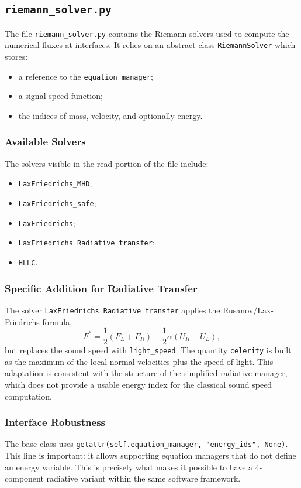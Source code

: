 \documentclass[a4paper, 11pt]{article}
\begin{document}
\subsection{\texttt{riemann\_solver.py}}
The file \texttt{riemann\_solver.py} contains the Riemann solvers used to compute the numerical fluxes at interfaces. It relies on an abstract class \texttt{RiemannSolver} which stores:
\begin{itemize}
    \item a reference to the \texttt{equation\_manager};
    \item a signal speed function;
    \item the indices of mass, velocity, and optionally energy.
\end{itemize}

\subsubsection*{Available Solvers}
The solvers visible in the read portion of the file include:
\begin{itemize}
    \item \texttt{LaxFriedrichs\_MHD};
    \item \texttt{LaxFriedrichs\_safe};
    \item \texttt{LaxFriedrichs};
    \item \texttt{LaxFriedrichs\_Radiative\_transfer};
    \item \texttt{HLLC}.
\end{itemize}

\subsubsection*{Specific Addition for Radiative Transfer}
The solver \texttt{LaxFriedrichs\_Radiative\_transfer} applies the Rusanov/Lax-Friedrichs formula,
\[
    F^* = \frac{1}{2}(F_L + F_R) - \frac{1}{2}\alpha (U_R - U_L),
\]
but replaces the sound speed with \texttt{light\_speed}. The quantity \texttt{celerity} is built as the maximum of the local normal velocities plus the speed of light. This adaptation is consistent with the structure of the simplified radiative manager, which does not provide a usable energy index for the classical sound speed computation.

\subsubsection*{Interface Robustness}
The base class uses \texttt{getattr(self.equation\_manager, "energy\_ids", None)}. This line is important: it allows supporting equation managers that do not define an energy variable. This is precisely what makes it possible to have a 4-component radiative variant within the same software framework.
\end{document}
